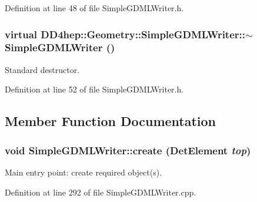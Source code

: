 Definition at line 48 of file SimpleGDMLWriter.h.\hypertarget{class_d_d4hep_1_1_geometry_1_1_simple_g_d_m_l_writer_ae3b2fd4273d79d7e59526531da0e9b96}{
\subsubsection[{$\sim$SimpleGDMLWriter}]{\setlength{\rightskip}{0pt plus 5cm}virtual DD4hep::Geometry::SimpleGDMLWriter::$\sim$SimpleGDMLWriter ()}}
\label{class_d_d4hep_1_1_geometry_1_1_simple_g_d_m_l_writer_ae3b2fd4273d79d7e59526531da0e9b96}


Standard destructor. 

Definition at line 52 of file SimpleGDMLWriter.h.

\subsection{Member Function Documentation}
\hypertarget{class_d_d4hep_1_1_geometry_1_1_simple_g_d_m_l_writer_a0ccf6cfb7ec9346ee6e5bba56f2a151a}{
\subsubsection[{create}]{\setlength{\rightskip}{0pt plus 5cm}void SimpleGDMLWriter::create ({\bf DetElement} {\em top})}}
\label{class_d_d4hep_1_1_geometry_1_1_simple_g_d_m_l_writer_a0ccf6cfb7ec9346ee6e5bba56f2a151a}


Main entry point: create required object(s). 

Definition at line 292 of file SimpleGDMLWriter.cpp.

